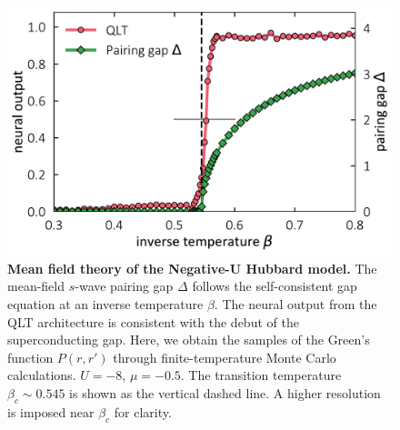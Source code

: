 \documentclass[amsmath,amssymb, aps, prx, longbibliography, twocolumn]{revtex4-1}
\begin{document}
\begin{figure}
\includegraphics[scale=.43]{fig2.pdf}
\caption{{\bf Mean field theory of the Negative-U Hubbard model.} The mean-field $s$-wave pairing gap $\Delta$ follows the self-consistent gap equation at an inverse temperature $\beta$. The neural output from the QLT architecture is consistent with the debut of the superconducting gap. Here, we obtain the samples of the Green's function $P(r, r')$ through finite-temperature Monte Carlo calculations. $U=-8$, $\mu=-0.5$. The transition temperature $\beta_c\sim 0.545$ is shown as the vertical dashed line. A higher resolution is imposed near $\beta_c$ for clarity.}\label{fig:mlmft}
\end{figure}



\end{document}
